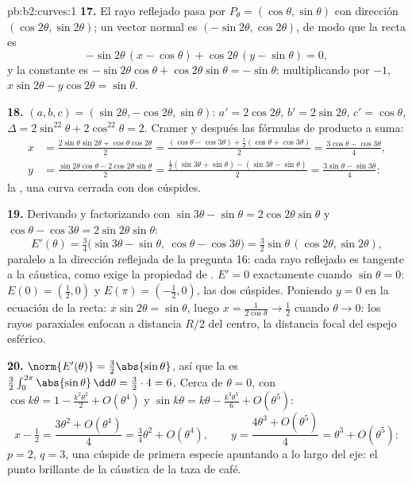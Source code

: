 \begin{solution}{pb:b2:curves:1}
\textbf{17.} El rayo reflejado pasa por $P_\theta = (\cos\theta,
\sin\theta)$ con dirección $(\cos2\theta, \sin2\theta)$; un vector
normal es $(-\sin2\theta, \cos2\theta)$, de modo que la recta es
\[
-\sin2\theta\,(x - \cos\theta) + \cos2\theta\,(y -
\sin\theta) = 0,
\]
y la constante es $-\sin2\theta\cos\theta + \cos2\theta\sin\theta =
-\sin\theta$: multiplicando por $-1$, $x\sin2\theta - y\cos2\theta =
\sin\theta$.

\textbf{18.} $(a, b, c) = (\sin2\theta, -\cos2\theta, \sin\theta)$:
$a' = 2\cos2\theta$, $b' = 2\sin2\theta$, $c' = \cos\theta$, $\Delta
= 2\sin^22\theta + 2\cos^22\theta = 2$. Cramer y después las fórmulas
de producto a suma:
\begin{align*}
x &= \frac{2\sin\theta\sin2\theta +
\cos\theta\cos2\theta}{2}
= \frac{(\cos\theta - \cos3\theta) + \frac12(\cos\theta +
\cos3\theta)}{2} = \frac{3\cos\theta - \cos3\theta}4,\\
y &= \frac{\sin2\theta\cos\theta - 2\cos2\theta\sin\theta}2
= \frac{\frac12(\sin3\theta + \sin\theta) - (\sin3\theta -
\sin\theta)}2 = \frac{3\sin\theta - \sin3\theta}4 :
\end{align*}
la , una curva cerrada con dos cúspides.

\textbf{19.} Derivando y factorizando con $\sin3\theta - \sin\theta =
2\cos2\theta\sin\theta$ y $\cos\theta - \cos3\theta =
2\sin2\theta\sin\theta$:
\[
E'(\theta) = \tfrac34\bigl(\sin3\theta - \sin\theta,\
\cos\theta - \cos3\theta\bigr)
= \tfrac32\sin\theta\,(\cos2\theta, \sin2\theta),
\]
paralelo a la dirección reflejada de la pregunta 16: cada rayo
reflejado es tangente a la cáustica, como exige la propiedad de
. $E' = 0$ exactamente cuando $\sin\theta = 0$: $E(0) =
(\tfrac12, 0)$ y $E(\pi) = (-\tfrac12, 0)$, las dos cúspides.
Poniendo $y = 0$ en la ecuación de la recta: $x\sin2\theta =
\sin\theta$, luego $x = \frac1{2\cos\theta} \to \frac12$ cuando
$\theta \to 0$: los rayos paraxiales enfocan a distancia $R/2$ del
centro, la distancia focal del espejo esférico.

\textbf{20.} $\norm{E'(\theta)} = \tfrac32\abs{\sin\theta}$, así que
la \omterm{def:b2:curves:length}{longitud} es $\tfrac32\int_0^{2\pi}\abs{\sin\theta}\, \dd\theta =
\tfrac32\cdot4 = 6$. Cerca de $\theta = 0$, con $\cos k\theta = 1 -
\tfrac{k^2\theta^2}2 + O(\theta^4)$ y $\sin k\theta = k\theta -
\tfrac{k^3\theta^3}6 + O(\theta^5)$:
\[
x - \tfrac12 = \frac{3\theta^2 + O(\theta^4)}{4}
= \tfrac34\theta^2 + O(\theta^4),
\qquad
y = \frac{4\theta^3 + O(\theta^5)}{4}
= \theta^3 + O(\theta^5) :
\]
$p = 2$, $q = 3$, una cúspide de primera especie apuntando a lo largo
del eje: el punto brillante de la cáustica de la taza de café.


\end{solution}
